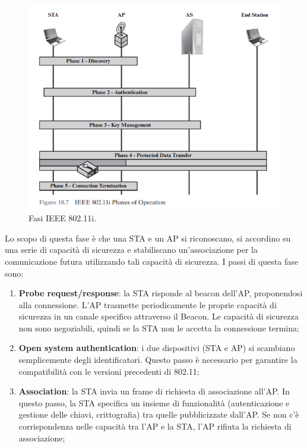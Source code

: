 \begin{figure}[h]
    \centering
    \includegraphics[width=1\textwidth]{images/chapter6/6-5.png}
    \caption{Fasi IEEE 802.11i.}
    \label{fig:6-4}
\end{figure}

Lo scopo di questa fase è che una STA e un AP si riconoscano, si accordino su una serie di capacità di sicurezza e stabiliscano un'associazione per la comunicazione futura utilizzando tali capacità di sicurezza. I passi di questa fase sono:
\begin{enumerate}
    \item \textbf{Probe request/response}: la STA risponde al beacon dell'AP, proponendosi alla connessione. L'AP trasmette periodicamente le proprie capacità di sicurezza in un canale specifico attraverso il Beacon. Le capacità di sicurezza non sono negoziabili, quindi se la STA non le accetta la connessione termina;
	\item \textbf{Open system authentication}: i due dispositivi (STA e AP) si scambiano semplicemente degli identificatori. Questo passo è necessario per garantire la compatibilità con le versioni precedenti di 802.11;
	\item \textbf{Association}: la STA invia un frame di richiesta di associazione all'AP. In questo passo, la STA specifica un insieme di funzionalità (autenticazione e gestione delle chiavi, crittografia) tra quelle pubblicizzate dall'AP. Se non c'è corrispondenza nelle capacità tra l'AP e la STA, l'AP rifiuta la richiesta di associazione;
\end{enumerate}

